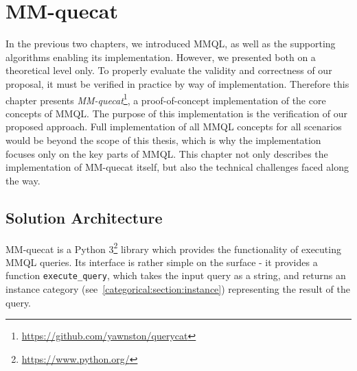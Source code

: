 \chapter{MM-quecat}
\label{quecat}

In the previous two chapters, we introduced MMQL, as well as the supporting algorithms enabling its implementation.
However, we presented both on a theoretical level only.
To properly evaluate the validity and correctness of our proposal, it must be verified in practice by way of implementation.
Therefore this chapter presents \textit{MM-quecat}\footnote{\url{https://github.com/yawnston/querycat}}, a proof-of-concept implementation of the core concepts of MMQL.
The purpose of this implementation is the verification of our proposed approach. Full implementation of all MMQL concepts for all scenarios would be beyond the scope of this thesis, which is why the implementation focuses only on the key parts of MMQL.
This chapter not only describes the implementation of MM-quecat itself, but also the technical challenges faced along the way.

\section{Solution Architecture}

MM-quecat is a Python 3\footnote{\url{https://www.python.org/}} library which provides the functionality of executing MMQL queries.
Its interface is rather simple on the surface - it provides a function \texttt{execute\_query}, which takes the input query as a string, and returns an instance category (see~\cref{categorical:section:instance}) representing the result of the query.

